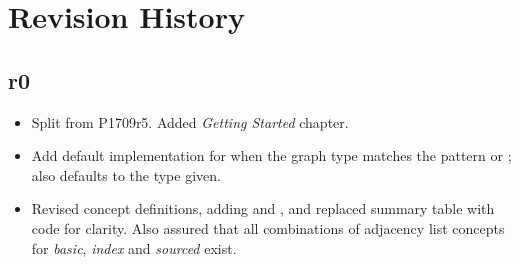 \section{Revision History}

\subsection*{\paperno r0}

\begin{itemize}
      \item Split from P1709r5. Added \textit{Getting Started} chapter.
      \item Add default implementation for  when the graph type matches the 
            pattern  or ;
             also defaults to the  type given.
      \item Revised concept definitions, adding  and , and replaced
            summary table with code for clarity. Also assured that all combinations of adjacency list concepts for
            \textit{basic}, \textit{index} and \textit{sourced} exist.
\end{itemize}
